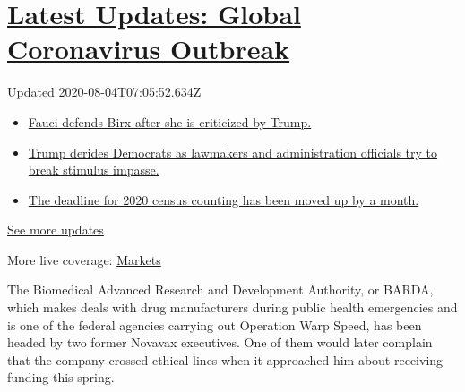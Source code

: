 \hypertarget{latest-updates-global-coronavirus-outbreak}{%
\section{\texorpdfstring{\href{https://www.nytimes3xbfgragh.onion/2020/08/03/world/coronavirus-covid-19.html?action=click\&pgtype=Article\&state=default\&region=MAIN_CONTENT_1\&context=storylines_live_updates}{Latest
Updates: Global Coronavirus
Outbreak}}{Latest Updates: Global Coronavirus Outbreak}}\label{latest-updates-global-coronavirus-outbreak}}

Updated 2020-08-04T07:05:52.634Z

\begin{itemize}
\tightlist
\item
  \href{https://www.nytimes3xbfgragh.onion/2020/08/03/world/coronavirus-covid-19.html?action=click\&pgtype=Article\&state=default\&region=MAIN_CONTENT_1\&context=storylines_live_updates\#link-4547638f}{Fauci
  defends Birx after she is criticized by Trump.}
\item
  \href{https://www.nytimes3xbfgragh.onion/2020/08/03/world/coronavirus-covid-19.html?action=click\&pgtype=Article\&state=default\&region=MAIN_CONTENT_1\&context=storylines_live_updates\#link-15e7f995}{Trump
  derides Democrats as lawmakers and administration officials try to
  break stimulus impasse.}
\item
  \href{https://www.nytimes3xbfgragh.onion/2020/08/03/world/coronavirus-covid-19.html?action=click\&pgtype=Article\&state=default\&region=MAIN_CONTENT_1\&context=storylines_live_updates\#link-e5a2cda}{The
  deadline for 2020 census counting has been moved up by a month.}
\end{itemize}

\href{https://www.nytimes3xbfgragh.onion/2020/08/03/world/coronavirus-covid-19.html?action=click\&pgtype=Article\&state=default\&region=MAIN_CONTENT_1\&context=storylines_live_updates}{See
more updates}

More live coverage:
\href{https://www.nytimes3xbfgragh.onion/live/2020/08/03/business/stock-market-today-coronavirus?action=click\&pgtype=Article\&state=default\&region=MAIN_CONTENT_1\&context=storylines_live_updates}{Markets}

The Biomedical Advanced Research and Development Authority, or BARDA,
which makes deals with drug manufacturers during public health
emergencies and is one of the federal agencies carrying out Operation
Warp Speed, has been headed by two former Novavax executives. One of
them would later complain that the company crossed ethical lines when it
approached him about receiving funding this spring.

